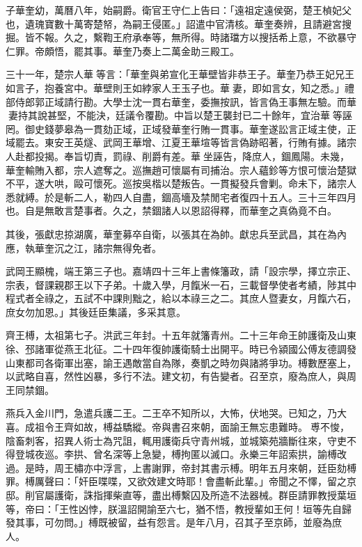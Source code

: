 子華奎幼，萬曆八年，始嗣爵。衛官王守仁上告曰：「遠祖定遠侯弼，楚王楨妃父也，遺瑰寶數十萬寄楚帑，為嗣王侵匿。」詔遣中官清核。華奎奏辨，且請避宮搜掘。皆不報。久之，繫鞫王府承奉等，無所得。時諸璫方以搜括希上意，不欲暴守仁罪。帝頗悟，罷其事。華奎乃奏上二萬金助三殿工。

三十一年，楚宗人華等言：「華奎與弟宣化王華壁皆非恭王子。華奎乃恭王妃兄王如言子，抱養宮中。華壁則王如綍家人王玉子也。華妻，即如言女，知之悉。」禮部侍郎郭正域請行勘。大學士沈一貫右華奎，委撫按訊，皆言偽王事無左驗。而華妻持其說甚堅，不能決，廷議令覆勘。中旨以楚王襲封已二十餘年，宜治華等誣罔。御史錢夢皋為一貫劾正域，正域發華奎行賄一貫事。華奎遂訟言正域主使，正域罷去。東安王英燧、武岡王華增、江夏王華塇等皆言偽跡昭著，行賄有據。諸宗人赴都投揭。奉旨切責，罰祿、削爵有差。華坐誣告，降庶人，錮鳳陽。未幾，華奎輸賄入都，宗人遮奪之。巡撫趙可懷屬有司捕治。宗人蘊鉁等方恨可懷治楚獄不平，遂大哄，毆可懷死。巡按吳楷以楚叛告。一貫擬發兵會剿。命未下，諸宗人悉就縛。於是斬二人，勒四人自盡，錮高墻及禁閒宅者復四十五人。三十三年四月也。自是無敢言楚事者。久之，禁錮諸人以恩詔得釋，而華奎之真偽竟不白。

其後，張獻忠掠湖廣，華奎募卒自衛，以張其在為帥。獻忠兵至武昌，其在為內應，執華奎沉之江，諸宗無得免者。

武岡王顯槐，端王第三子也。嘉靖四十三年上書條籓政，請「設宗學，擇立宗正、宗表，督課親郡王以下子弟。十歲入學，月餼米一石，三載督學使者考績，陟其中程式者全祿之，五試不中課則黜之，給以本祿三之二。其庶人暨妻女，月餼六石，庶女勿加恩。」其後廷臣集議，多采其意。

齊王榑，太祖第七子。洪武三年封。十五年就籓青州。二十三年命王帥護衛及山東徐、邳諸軍從燕王北征。二十四年復帥護衛騎士出開平。時已令潁國公傅友德調發山東都司各衛軍出塞，諭王遇敵當自為隊，奏凱之時勿與諸將爭功。榑數歷塞上，以武略自喜，然性凶暴，多行不法。建文初，有告變者。召至京，廢為庶人，與周王同禁錮。

燕兵入金川門，急遣兵護二王。二王卒不知所以，大怖，伏地哭。已知之，乃大喜。成祖令王齊如故，榑益驕縱。帝與書召來朝，面諭王無忘患難時。尃不悛，陰畜刺客，招異人術士為咒詛，輒用護衛兵守青州城，並城築苑牆斷往來，守吏不得登城夜巡。李拱、曾名深等上急變，榑拘匿以滅口。永樂三年詔索拱，諭榑改過。是時，周王橚亦中浮言，上書謝罪，帝封其書示榑。明年五月來朝，廷臣劾榑罪。榑厲聲曰：「奸臣喋喋，又欲效建文時耶！會盡斬此輩。」帝聞之不懌，留之京邸。削官屬護衛，誅指揮柴直等，盡出榑繫囚及所造不法器械。群臣請罪教授葉垣等，帝曰：「王性凶悖，朕溫詔開諭至六七，猶不悟，教授輩如王何！垣等先自歸發其事，可勿問。」榑既被留，益有怨言。是年八月，召其子至京師，並廢為庶人。

